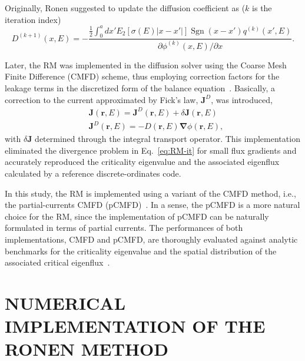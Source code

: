 \documentclass[letterpaper]{mc2021}
\newcommand{\rr}{\bm{r}}
\newcommand{\rE}{\ensuremath{(\rr,E)}}
\newcommand{\bnabla}{\ensuremath{\bm{\nabla}}}
\begin{document}
\vspace{-1.5mm}

Originally, Ronen suggested to update the diffusion coefficient as ($k$ is the iteration index)~\cite{Ronen-2004}
\begin{equation}\label{eq:RM-it}
	D^{(k+1)}(x,E) = -\frac{\displaystyle \frac{1}{2}\int_0^a dx' E_2[\sigma(E)\lvert
		x-x'\rvert]\operatorname{Sgn}(x-x')q^{(k)}(x',E)}
	{\partial \phi^{(k)}(x,E)/\partial x}.
\end{equation}

\vspace{-10.5mm}

Later, the RM was implemented in the diffusion solver using the Coarse Mesh Finite Difference (CMFD) scheme, thus employing correction factors for the leakage terms in the discretized form of the balance equation~\cite{Tomatis-2011,Gross-2020}. Basically, a correction to the current approximated by Fick's law, $\bm{J}^D$, was introduced,
\begin{align}
\label{eq:Fick}
& \bm{J}\rE = \bm{J}^D\rE + \delta\bm{J}\rE \\ 
& \bm{J}^D\rE = -D\rE\bnabla\phi\rE,
\end{align}
with $\delta\bm{J}$ determined through the integral transport operator.  This implementation eliminated the divergence problem in Eq.~\eqref{eq:RM-it} for small flux gradients and accurately reproduced the criticality eigenvalue and the associated eigenflux calculated by a reference discrete-ordinates code.

\vspace{-1.5mm}

In this study, the RM is implemented using a variant of the CMFD method, i.e., the partial-currents CMFD (pCMFD)~\cite{Cho-2003}. In a sense, the pCMFD is a more natural choice for the RM, since the implementation of pCMFD can be naturally formulated in terms of partial currents. The performances of both implementations, CMFD and pCMFD, are thoroughly evaluated against analytic benchmarks for the criticality eigenvalue and the spatial distribution of the associated critical eigenflux~\cite{Sood2003}.    

\section{NUMERICAL IMPLEMENTATION OF THE RONEN METHOD} 
\label{sec:num-imp}
\end{document}
